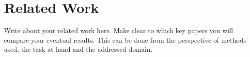 \section{Related Work}
\label{sec:related_work}
Write about your related work here. Make clear to which key papers you will compare your eventual results. This can be done from the perspective of methods used, the task at hand and the addressed domain.

